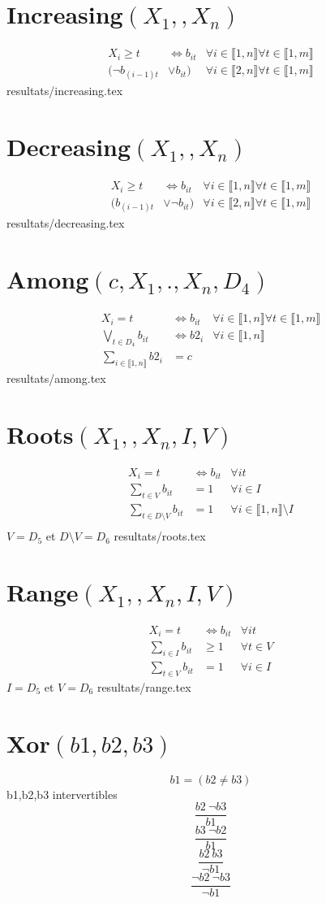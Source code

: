 \documentclass{article}
\newcommand{\increasing}{Increasing$(\{X_1,\ldots,X_n\})~$}
\newcommand{\decreasing}{Decreasing$(\{X_1,\ldots,X_n\})~$}
\newcommand{\roots}{Roots$(\{X_1,\ldots,X_n\},I,V)~$}
\newcommand{\range}{Range$(\{X_1,\ldots,X_n\},I,V)~$}
\newcommand{\among}{Among$(c,\{X_1,.\ldots,X_n\},D_4)~$}
\newcommand{\I}{i\in\llbracket1,n\rrbracket}
\newcommand{\T}{t\in\llbracket1,m\rrbracket}
\newcommand{\fai}{\forall\I}
\newcommand{\fat}{\forall\T}
\newcommand{\fit}{\fai\fat}
\def\{{}%
\def\}{}%
\def\ldots{}%
\begin{document}
\section{\texorpdfstring{\increasing}{increasing}}
\begin{align*}
    X_i \geq t & \iff b_{it}&\fit\\
    (\neg b_{(i-1)t} & \vee b_{it})&\forall i\in\llbracket2,n\rrbracket\fat 
\end{align*}
{resultats/increasing.tex}

\section{\texorpdfstring{\decreasing}{decreasing}}
\begin{align*}
    X_i \geq t & \iff b_{it}&\fit\\
    (b_{(i-1)t} & \vee \neg b_{it})&\forall i\in\llbracket2,n\rrbracket\fat 
\end{align*}
{resultats/decreasing.tex}

\section{\texorpdfstring{\among}{among}}
\begin{align*}
    X_i =t & \iff b_{it}&\fit\\
    \bigvee_{t\in D_4}b_{it}&\iff b2_i&\fai\\
    \sum_{\I}b2_i & =c
\end{align*}
{resultats/among.tex}

\section{\texorpdfstring{\roots}{roots}}
\begin{align*}
    X_i=t &\iff b_{it}&\forall it\\
    \sum_{t\in V}b_{it} & =1&\forall i \in I\\
    \sum_{t\in D \setminus V}b_{it} & =1&\forall i \in \llbracket1,n\rrbracket \setminus I\\
\end{align*}
$V=D_5$ et $D \setminus V=D_6$
{resultats/roots.tex}

\section{\texorpdfstring{\range}{range}}
\begin{align*}
    X_i=t &\iff b_{it}&\forall it\\
    \sum_{i\in I}b_{it} & \geq 1 &\forall t\in V\\
    \sum_{t\in V}b_{it} & =1&\forall i \in I
\end{align*}
$I=D_5$ et $V=D_6$
{resultats/range.tex}

\section{\texorpdfstring{Xor$(b1,b2,b3)$}{xor}}
$$b1=(b2\neq b3)$$
b1,b2,b3 intervertibles
$$\frac{b2~\neg b3}{b1}$$
$$\frac{b3~\neg b2}{b1}$$
$$\frac{b2~ b3}{\neg b1}$$
$$\frac{\neg b2~\neg b3}{\neg b1}$$
\end{document}
